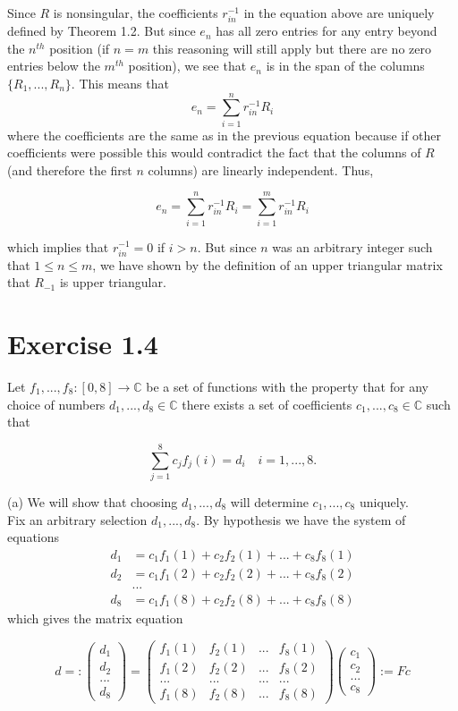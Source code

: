 \documentclass[11pt]{article}
\begin{document}
Since $R$ is nonsingular, the coefficients $r_{in}^{-1}$ in the equation above are uniquely defined by Theorem 1.2. But since $e_n$ has all zero entries for any entry beyond the $n^{th}$ position (if $n = m$ this reasoning will still apply but there are no zero entries below the $m^{th}$ position), we see that $e_n$ is in the span of the columns $\{R_1,...,R_n\}$. This means that
$$ e_n = \sum_{i=1}^{n} r_{in}^{-1}R_i$$ where the coefficients are the same as in the previous equation because if other coefficients were possible this would contradict the fact that the columns of $R$ (and therefore the first $n$ columns) are linearly independent. Thus,

$$e_n = \sum_{i=1}^{n} r_{in}^{-1}R_i = \sum_{i=1}^{m} r_{in}^{-1}R_i$$

which implies that $r_{in}^{-1} = 0 $ if $i>n$. But since $n$ was an arbitrary integer such that $1\leq n \leq m$, we have shown by the definition of an upper triangular matrix that $R_{-1}$ is upper triangular. 

\section*{Exercise 1.4}
Let $f_1,...,f_8 : [0,8] \rightarrow \mathbb{C}$ be a set of functions with the property that for any choice of numbers $d_1,...,d_8 \in \mathbb{C}$ there exists a set of coefficients $c_1,...,c_8 \in \mathbb{C}$ such that 

$$\sum_{j=1}^8 c_jf_j(i) = d_i \quad i = 1,...,8.$$

(a) We will show that choosing $d_1,...,d_8$ will determine $c_1,...,c_8$ uniquely. \\

Fix an arbitrary selection $d_1,...,d_8$. By hypothesis we have the system of equations 
\begin{align*}
d_1 &= c_1f_1(1) + c_2f_2(1) + ... + c_8f_8(1) \\
d_2 &= c_1f_1(2) + c_2f_2(2) + ... + c_8f_8(2) \\
&...\\
d_8 &= c_1f_1(8) + c_2f_2(8) + ... + c_8f_8(8)
\end{align*}
which gives the matrix equation

$$d =: \begin{pmatrix} d_1 \\ d_2 \\ ... \\ d_8 \end{pmatrix}=
\begin{pmatrix}
f_1(1) & f_2(1) & ... & f_8(1) \\
f_1(2) & f_2(2) & ... & f_8(2) \\
... & ... & ... & ...\\
f_1(8) & f_2(8) & ... & f_8(8)
\end{pmatrix} \begin{pmatrix}c_1 \\ c_2 \\... \\c_8\end{pmatrix} := Fc
$$
\end{document}
